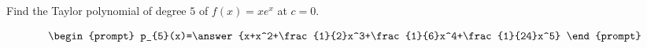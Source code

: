 \documentclass{ximera}
\author{Gregory Hartman \and Matthew Carr}
\begin{document}
\begin{exercise}




Find the Taylor polynomial of degree $5$ of $f(x)=x e^{x}$ at $c=0$.

\[
\begin{prompt}
p_{5}(x)=\answer{x+x^2+\frac{1}{2}x^3+\frac{1}{6}x^4+\frac{1}{24}x^5}
\end{prompt}
\]

\end{exercise}
\end{document}
